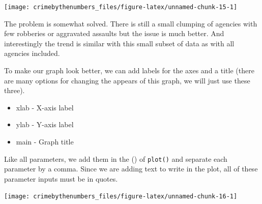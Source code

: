 \documentclass[
]{krantz}
\makeatletter
\newenvironment{Shaded}{\begin{snugshade}}{\end{snugshade}}
\newcommand{\AttributeTok}[1]{\textcolor[rgb]{0.61,0.61,0.61}{#1}}
\newcommand{\FunctionTok}[1]{\textcolor[rgb]{0,0,0}{#1}}
\newcommand{\NormalTok}[1]{#1}
\newcommand{\SpecialCharTok}[1]{\textcolor[rgb]{0,0,0}{#1}}
\newcommand{\StringTok}[1]{\textcolor[rgb]{0.5,0.5,0.5}{#1}}
\providecommand{\tightlist}{%
  \setlength{\itemsep}{0pt}\setlength{\parskip}{0pt}}
\newenvironment{kframe}{%
\medskip{}
\setlength{\fboxsep}{.8em}
 \def\at@end@of@kframe{}%
 \ifinner\ifhmode%
  \def\at@end@of@kframe{\end{minipage}}%
  \begin{minipage}{\columnwidth}%
 \fi\fi%
 \def\FrameCommand##1{\hskip\@totalleftmargin \hskip-\fboxsep
 \colorbox{shadecolor}{##1}\hskip-\fboxsep
     \hskip-\linewidth \hskip-\@totalleftmargin \hskip\columnwidth}%
 \MakeFramed {\advance\hsize-\width
   \@totalleftmargin\z@ \linewidth\hsize
   \@setminipage}}%
 {\par\unskip\endMakeFramed%
 \at@end@of@kframe}
\renewenvironment{Shaded}{\begin{kframe}}{\end{kframe}}
\makeatother
\begin{document}
\begin{Shaded}
\end{Shaded}

\begin{center}\texttt{[image: crimebythenumbers\_files/figure-latex/unnamed-chunk-15-1]} \end{center}

The problem is somewhat solved. There is still a small clumping of agencies with few robberies or aggravated assaults but the issue is much better. And interestingly the trend is similar with this small subset of data as with all agencies included.

To make our graph look better, we can add labels for the axes and a title (there are many options for changing the appears of this graph, we will just use these three).

\begin{itemize}
\tightlist
\item
  xlab - X-axis label
\item
  ylab - Y-axis label
\item
  main - Graph title
\end{itemize}

Like all parameters, we add them in the () of \texttt{plot()} and separate each parameter by a comma. Since we are adding text to write in the plot, all of these parameter inputs must be in quotes.

\begin{Shaded}
\end{Shaded}

\begin{center}\texttt{[image: crimebythenumbers\_files/figure-latex/unnamed-chunk-16-1]} \end{center}
\end{document}
